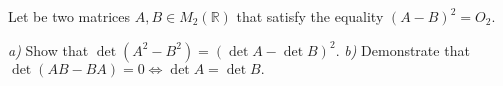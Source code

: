 Let be two matrices $ A,B\in M_2\left(\mathbb{R}\right) $ that satisfy the equality $ \left( A-B\right)^2 =O_2. $

\textit{a)} Show that $ \det\left( A^2-B^2\right) =\left( \det A -\det B\right)^2. $
\textit{b)} Demonstrate that $ \det\left( AB-BA\right) =0\iff \det A=\det B. $
